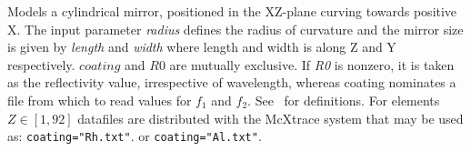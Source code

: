 Models a cylindrical mirror, positioned in the XZ-plane curving towards
positive X. The input parameter \textit{radius} defines the radius of curvature
and the mirror size is given by \textit{length} and \textit{width} where length
and width is along Z and Y respectively. $coating$ and $R0$ are mutually
exclusive. If \textit{R0} is nonzero, it is taken as the reflectivity value,
irrespective of wavelength, whereas coating nominates a file from which to read
values for $f_1$ and $f_2$. See~\cite{NIST-ffast} for definitions. For
elements $Z\in[1,92]$ datafiles are distributed with the McXtrace system that
may be used as: \verb+coating="Rh.txt"+. or \verb+coating="Al.txt"+. 
